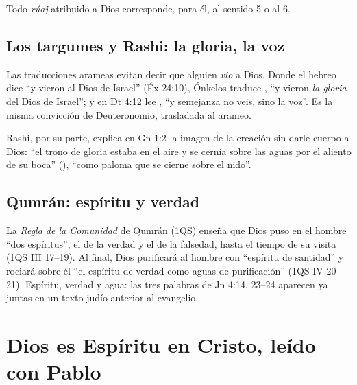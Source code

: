 Todo \emph{rúaj} atribuido a Dios corresponde, para él, al sentido 5 o al 6.


\subsection{Los targumes y Rashi: la gloria, la voz}

Las traducciones arameas evitan decir que alguien \emph{vio} a Dios. Donde el hebreo dice ``y vieron al Dios de Israel'' (Éx 24:10), Ónkelos traduce , ``y vieron \emph{la gloria} del Dios de Israel''; y en Dt 4:12 lee , ``y semejanza no veis, sino la voz''. Es la misma convicción de Deuteronomio, trasladada al arameo.

Rashi, por su parte, explica en Gn 1:2 la imagen de la creación sin darle cuerpo a Dios: ``el trono de gloria estaba en el aire y se cernía sobre las aguas por el aliento de su boca'' (), ``como paloma que se cierne sobre el nido''.


\subsection{Qumrán: espíritu y verdad}

La \emph{Regla de la Comunidad} de Qumrán (1QS) enseña que Dios puso en el hombre ``dos espíritus'', el de la verdad y el de la falsedad, hasta el tiempo de su visita (1QS III 17--19). Al final, Dios purificará al hombre con ``espíritu de santidad'' y rociará sobre él ``el espíritu de verdad como aguas de purificación'' (1QS IV 20--21). Espíritu, verdad y agua: las tres palabras de Jn 4:14, 23--24 aparecen ya juntas en un texto judío anterior al evangelio.


\section{Dios es Espíritu en Cristo, leído con Pablo}\label{sec:cristo-esp}

